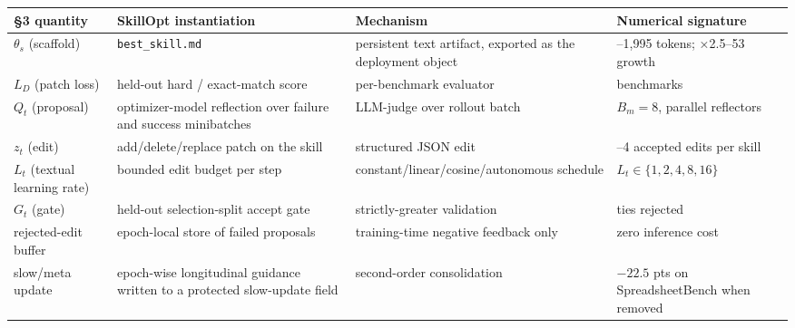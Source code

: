 {\def\LTcaptype{none} %
\begin{longtable}[]{@{}
  >{\raggedright\arraybackslash}p{}
  >{\raggedright\arraybackslash}p{}
  >{\raggedright\arraybackslash}p{}
  >{\raggedright\arraybackslash}p{}@{}}
\toprule\noalign{}
\begin{minipage}[b]{\linewidth}\raggedright
§3 quantity
\end{minipage} & \begin{minipage}[b]{\linewidth}\raggedright
SkillOpt instantiation
\end{minipage} & \begin{minipage}[b]{\linewidth}\raggedright
Mechanism
\end{minipage} & \begin{minipage}[b]{\linewidth}\raggedright
Numerical signature
\end{minipage} \\
\midrule\noalign{}
\endhead
\bottomrule\noalign{}
\endlastfoot
\(\theta_s\) (scaffold) & \texttt{best\_skill.md} & persistent text
artifact, exported as the deployment object & 379--1,995 tokens;
×2.5--53 growth \\
\(L_D\) (patch loss) & held-out hard / exact-match score & per-benchmark
evaluator & 6 benchmarks \\
\(Q_t\) (proposal) & optimizer-model reflection over failure and success
minibatches & LLM-judge over rollout batch & \(B_m{=}8\), parallel
reflectors \\
\(z_t\) (edit) & add/delete/replace patch on the skill & structured JSON
edit & 1--4 accepted edits per skill \\
\(L_t\) (textual learning rate) & bounded edit budget per step &
constant/linear/cosine/autonomous schedule &
\(L_t \in \{1,2,4,8,16\}\) \\
\(G_t\) (gate) & held-out selection-split accept gate & strictly-greater
validation & ties rejected \\
rejected-edit buffer & epoch-local store of failed proposals &
training-time negative feedback only & zero inference cost \\
slow/meta update & epoch-wise longitudinal guidance written to a
protected slow-update field & second-order consolidation & \(-22.5\) pts
on SpreadsheetBench when removed \\
\end{longtable}
}

